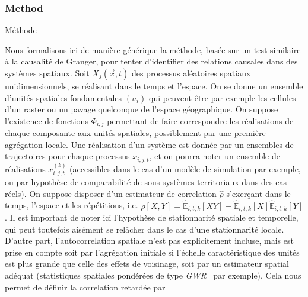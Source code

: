 


\subsubsection{Method}{Méthode}


Nous formalisons ici de manière générique la méthode, basée sur un test similaire à la causalité de Granger, pour tenter d'identifier des relations causales dans des systèmes spatiaux. Soit $X_j(\vec{x},t)$ des processus aléatoires spatiaux unidimensionnels, se réalisant dans le temps et l'espace. On se donne un ensemble d'unités spatiales fondamentales $(u_i)$ qui peuvent être par exemple les cellules d'un raster ou un pavage quelconque de l'espace géographique. On suppose l'existence de fonctions $\Phi_{i,j}$ permettant de faire correspondre les réalisations de chaque composante aux unités spatiales, possiblement par une première agrégation locale. Une réalisation d'un système est donnée par un ensembles de trajectoires pour chaque processus $x_{i,j,t}$, et on pourra noter un ensemble de réalisations $x^{(k)}_{i,j,t}$ (accessibles dans le cas d'un modèle de simulation par exemple, ou par hypothèse de comparabilité de sous-systèmes territoriaux dans des cas réels). On suppose disposer d'un estimateur de correlation $\hat{\rho}$ s'exerçant dans le temps, l'espace et les répétitions, i.e. $\hat{\rho}\left[X,Y\right] = \hat{\mathbb{E}}_{i,t,k}\left[XY\right] - \hat{\mathbb{E}}_{i,t,k}\left[X\right]\hat{\mathbb{E}}_{i,t,k}\left[Y\right]$. Il est important de noter ici l'hypothèse de stationnarité spatiale et temporelle, qui peut toutefois aisément se relâcher dans le cas d'une stationnarité locale. D'autre part, l'autocorrelation spatiale n'est pas explicitement incluse, mais est prise en compte soit par l'agrégation initiale si l'échelle caractéristique des unités est plus grande que celle des effets de voisinage, soit par un estimateur spatial adéquat (statistiques spatiales pondérées de type \emph{GWR}~\cite{brunsdon1998geographically} par exemple). Cela nous permet de définir la correlation retardée par

